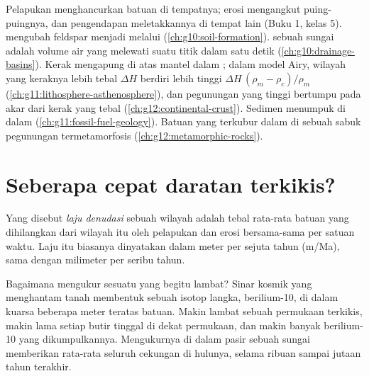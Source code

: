 \begin{recall}
Pelapukan menghancurkan batuan di tempatnya; erosi mengangkut puing-puingnya,
dan pengendapan meletakkannya di tempat lain (Buku 1, kelas 5). 
mengubah feldspar menjadi  melalui 
(\cref{ch:g10:soil-formation}).  sebuah sungai adalah volume air yang
melewati suatu titik dalam satu detik (\cref{ch:g10:drainage-basins}). Kerak
mengapung di atas mantel dalam ; dalam model Airy, wilayah yang
keraknya lebih tebal $\Delta H$ berdiri lebih tinggi
$\Delta H\,(\rho_m - \rho_c)/\rho_m$
(\cref{ch:g11:lithosphere-asthenosphere}), dan pegunungan yang tinggi bertumpu
pada akar dari kerak yang tebal (\cref{ch:g12:continental-crust}). Sedimen
menumpuk di dalam  (\cref{ch:g11:fossil-fuel-geology}). Batuan
yang terkubur dalam di sebuah sabuk pegunungan termetamorfosis
(\cref{ch:g12:metamorphic-rocks}).
\end{recall}

\section{Seberapa cepat daratan terkikis?}

\begin{definition}\label{def:g12:destruction-of-mountains:denudation}
Yang disebut \emph{laju denudasi} sebuah wilayah adalah
tebal rata-rata batuan yang dihilangkan dari wilayah itu oleh pelapukan dan
erosi bersama-sama per satuan waktu. Laju itu biasanya dinyatakan dalam meter
per sejuta tahun (\unit{m/Ma}), sama dengan milimeter per seribu tahun.
\end{definition}

Bagaimana mengukur sesuatu yang begitu lambat? Sinar kosmik yang menghantam
tanah membentuk sebuah isotop langka, berilium-10, di dalam kuarsa beberapa
meter teratas batuan. Makin lambat sebuah permukaan terkikis, makin lama
setiap butir tinggal di dekat permukaan, dan makin banyak berilium-10 yang
dikumpulkannya. Mengukurnya di dalam pasir sebuah sungai memberikan  rata-rata seluruh cekungan di hulunya, selama ribuan sampai jutaan
tahun terakhir.

